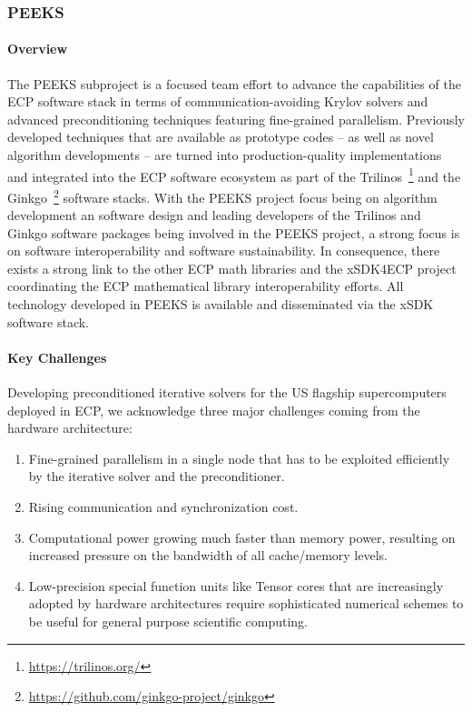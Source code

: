 \subsubsection{ PEEKS} 
\paragraph{Overview} 
The PEEKS subproject is a focused team effort to advance the capabilities of the
ECP software stack in terms of communication-avoiding Krylov solvers and
advanced preconditioning techniques featuring fine-grained parallelism.
Previously developed techniques that are available as prototype codes -- as
well as novel algorithm developments -- are turned into production-quality 
implementations and integrated into the ECP software ecosystem 
as part of the Trilinos~\footnote{\url{https://trilinos.org/}} and the  
Ginkgo~\footnote{\url{https://github.com/ginkgo-project/ginkgo}} software 
stacks. 
With the PEEKS project focus being on algorithm development an software design 
and leading developers of the Trilinos and Ginkgo software packages being 
involved in the PEEKS project, a strong focus is on software interoperability 
and software sustainability. In consequence, there exists a strong link to the 
other ECP math libraries and the xSDK4ECP project coordinating the ECP 
mathematical library interoperability efforts. All technology developed in 
PEEKS is available and disseminated via the xSDK software stack.


\paragraph{Key  Challenges}
Developing preconditioned iterative solvers for the US flagship supercomputers 
deployed in ECP, we acknowledge three major challenges coming from the hardware 
architecture:
\begin{enumerate}
\item 
Fine-grained parallelism in a single node that has to be exploited efficiently 
by the iterative solver and the preconditioner.
\item
Rising communication and synchronization cost.
\item
Computational power growing much faster than memory power, resulting on 
increased pressure on the bandwidth of all cache/memory levels.
\item 
Low-precision special function units like Tensor cores that are increasingly 
adopted by hardware architectures require sophisticated numerical schemes to be 
useful for general purpose scientific computing.
\end{enumerate}

